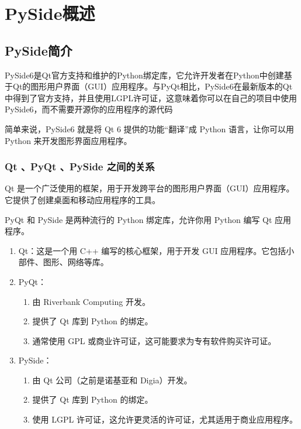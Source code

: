 \chapter{PySide概述}

\section{PySide简介}
PySide6是Qt官方支持和维护的Python绑定库，它允许开发者在Python中创建基于Qt的图形用户界面（GUI）应用程序。与PyQt相比，PySide6在最新版本的Qt中得到了官方支持，并且使用LGPL许可证，这意味着你可以在自己的项目中使用PySide6，而不需要开源你的应用程序的源代码

简单来说，PySide6 就是将 Qt 6 提供的功能“翻译”成 Python 语言，让你可以用 Python 来开发图形界面应用程序。

\subsection{Qt 、PyQt 、PySide 之间的关系}
Qt 是一个广泛使用的框架，用于开发跨平台的图形用户界面（GUI）应用程序。它提供了创建桌面和移动应用程序的工具。

PyQt 和 PySide 是两种流行的 Python 绑定库，允许你用 Python 编写 Qt 应用程序。
\begin{enumerate}[label=\arabic*)]
    \item Qt：这是一个用 C++ 编写的核心框架，用于开发 GUI 应用程序。它包括小部件、图形、网络等库。
    \item PyQt：
    \begin{enumerate}[itemindent=1em,label=\arabic*)]
        \item 由 Riverbank Computing 开发。
        \item 提供了 Qt 库到 Python 的绑定。
        \item 通常使用 GPL 或商业许可证，这可能要求为专有软件购买许可证。
    \end{enumerate}
    
    \item PySide：
    \begin{enumerate}[itemindent=1em,label=\arabic*)]
        \item 由 Qt 公司（之前是诺基亚和 Digia）开发。
        \item 提供了 Qt 库到 Python 的绑定。
        \item 使用 LGPL 许可证，这允许更灵活的许可证，尤其适用于商业应用程序。
    \end{enumerate}
\end{enumerate}

